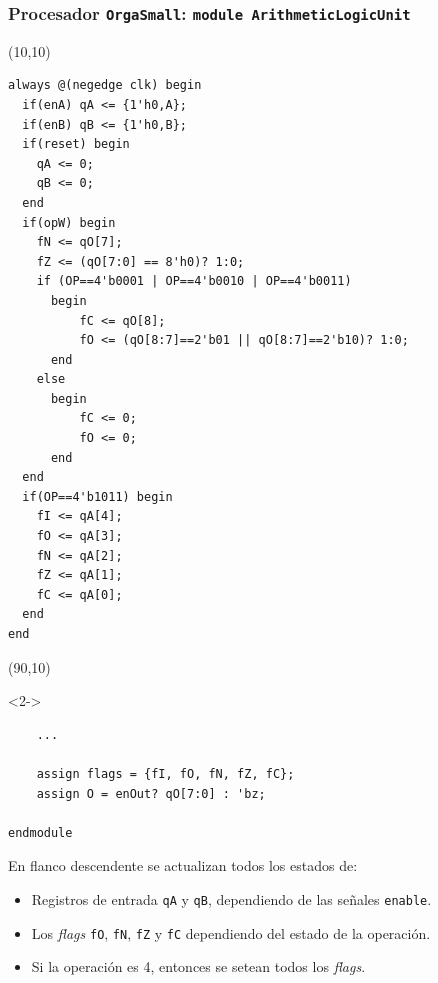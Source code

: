 \documentclass[aspectratio=169]{beamer}
\begin{document}
\begin{frame}[fragile,t]
    \frametitle{Procesador \texttt{OrgaSmall}: \texttt{module ArithmeticLogicUnit}}
    \begin{textblock}{75}(10,10)
\lstset{basicstyle=\tiny}
\begin{lstlisting}
always @(negedge clk) begin
  if(enA) qA <= {1'h0,A};
  if(enB) qB <= {1'h0,B};
  if(reset) begin
    qA <= 0;
    qB <= 0;
  end
  if(opW) begin
    fN <= qO[7];
    fZ <= (qO[7:0] == 8'h0)? 1:0;
    if (OP==4'b0001 | OP==4'b0010 | OP==4'b0011)
      begin
          fC <= qO[8];
          fO <= (qO[8:7]==2'b01 || qO[8:7]==2'b10)? 1:0;
      end
    else
      begin
          fC <= 0;
          fO <= 0;
      end
  end
  if(OP==4'b1011) begin
    fI <= qA[4]; 
    fO <= qA[3]; 
    fN <= qA[2]; 
    fZ <= qA[1]; 
    fC <= qA[0];
  end
end
\end{lstlisting}
    \end{textblock}
    \begin{textblock}{60}(90,10)
    \begin{onlyenv}<2->
\lstset{basicstyle=\tiny}
\begin{lstlisting}
    ...

    assign flags = {fI, fO, fN, fZ, fC};
    assign O = enOut? qO[7:0] : 'bz;

endmodule
\end{lstlisting}
    \small
    En flanco descendente se actualizan todos los estados de:\\
    \begin{itemize}
    \item Registros de entrada \texttt{qA} y \texttt{qB}, dependiendo de las señales \texttt{enable}.
    \item Los \emph{flags} \texttt{fO}, \texttt{fN}, \texttt{fZ} y \texttt{fC} dependiendo del estado de la operación.
    \item Si la operación es 4, entonces se setean todos los \emph{flags}.
    \end{itemize}
    \end{onlyenv}
    \end{textblock}
\end{frame}
\end{document}
